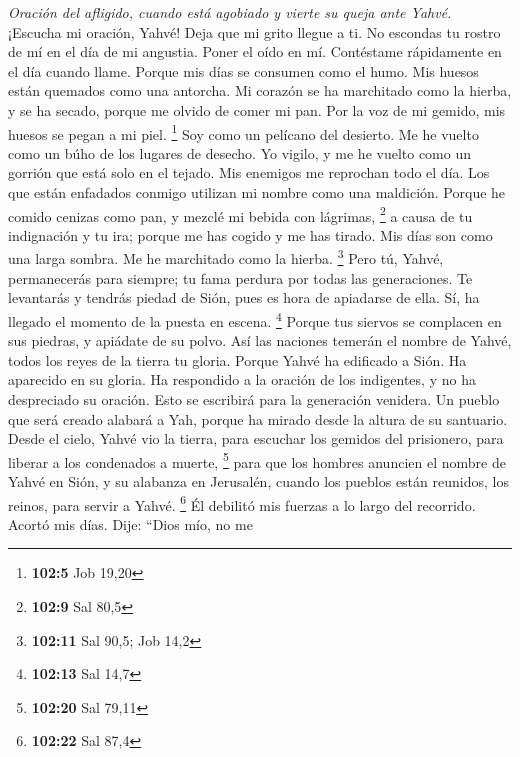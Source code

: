 \begin{paracol}{2}
\emph{Oración del afligido, cuando está agobiado y vierte su queja ante
Yahvé.}\\
 ¡Escucha mi oración, Yahvé! Deja que mi grito llegue a
ti.  No escondas tu rostro de mí en el día de mi angustia.
Poner el oído en mí. Contéstame rápidamente en el día cuando llame.
 Porque mis días se consumen como el humo. Mis huesos
están quemados como una antorcha.  Mi corazón se ha
marchitado como la hierba, y se ha secado, porque me olvido de comer mi
pan.  Por la voz de mi gemido, mis huesos se pegan a mi
piel. \footnote{\textbf{102:5} Job 19,20}  Soy como un
pelícano del desierto. Me he vuelto como un búho de los lugares de
desecho.  Yo vigilo, y me he vuelto como un gorrión que
está solo en el tejado.  Mis enemigos me reprochan todo el
día. Los que están enfadados conmigo utilizan mi nombre como una
maldición.  Porque he comido cenizas como pan, y mezclé mi
bebida con lágrimas, \footnote{\textbf{102:9} Sal 80,5} 
a causa de tu indignación y tu ira; porque me has cogido y me has
tirado.  Mis días son como una larga sombra. Me he
marchitado como la hierba. \footnote{\textbf{102:11} Sal 90,5; Job 14,2}
 Pero tú, Yahvé, permanecerás para siempre; tu fama
perdura por todas las generaciones.  Te levantarás y
tendrás piedad de Sión, pues es hora de apiadarse de ella. Sí, ha
llegado el momento de la puesta en escena. \footnote{\textbf{102:13} Sal
  14,7}  Porque tus siervos se complacen en sus piedras,
y apiádate de su polvo.  Así las naciones temerán el
nombre de Yahvé, todos los reyes de la tierra tu gloria. 
Porque Yahvé ha edificado a Sión. Ha aparecido en su gloria.
 Ha respondido a la oración de los indigentes, y no ha
despreciado su oración.  Esto se escribirá para la
generación venidera. Un pueblo que será creado alabará a Yah,
 porque ha mirado desde la altura de su santuario. Desde
el cielo, Yahvé vio la tierra,  para escuchar los gemidos
del prisionero, para liberar a los condenados a muerte, \footnote{\textbf{102:20}
  Sal 79,11}  para que los hombres anuncien el nombre de
Yahvé en Sión, y su alabanza en Jerusalén,  cuando los
pueblos están reunidos, los reinos, para servir a Yahvé. \footnote{\textbf{102:22}
  Sal 87,4}  Él debilitó mis fuerzas a lo largo del
recorrido. Acortó mis días.  Dije: ``Dios mío, no me

\end{paracol}
